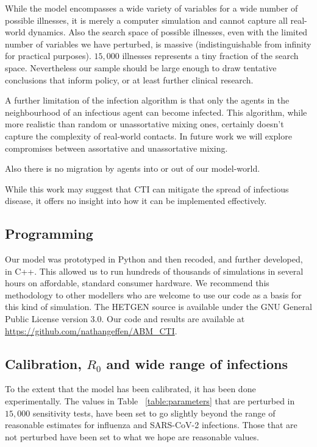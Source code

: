\documentclass{article}
\begin{document}
While the model encompasses a wide variety of variables for a wide number of
possible illnesses, it is merely a computer simulation and cannot capture all
real-world dynamics. Also the search space of possible illnesses, even with the
limited number of variables we have perturbed, is massive (indistinguishable
from infinity for practical purposes). $15,000$ illnesses represents a tiny
fraction of the search space. Nevertheless our sample should be large enough to
draw tentative conclusions that inform policy, or at least further clinical
research.

A further limitation of the infection algorithm is that only the agents in the
neighbourhood of an infectious agent can become infected. This algorithm, while
more realistic than random or unassortative mixing ones, certainly doesn't
capture the complexity of real-world contacts. In future work we will explore
compromises between assortative and unassortative mixing.

Also there is no migration by agents into or out of our model-world.

While this work may suggest that CTI can mitigate the spread of infectious
disease, it offers no insight into how it can be implemented effectively.

\subsection{Programming}

Our model was prototyped in Python and then recoded, and further developed, in
C++. This allowed us to run hundreds of thousands of simulations in several
hours on affordable, standard consumer hardware. We recommend this methodology
to other modellers who are welcome to use our code as a basis for this kind of
simulation. The HETGEN source is available under the GNU General Public License
version 3.0. Our code and results are available at \url{https://github.com/nathangeffen/ABM_CTI}.

\subsection{Calibration, $R_0$ and wide range of infections}

To the extent that the model has been calibrated, it has been done
experimentally. The values in Table ~\ref{table:parameters} that are perturbed
in $15,000$ sensitivity tests, have been set to go slightly beyond the range of
reasonable estimates for influenza and SARS-CoV-2 infections. Those that are not
perturbed have been set to what we hope are reasonable values.
\end{document}
